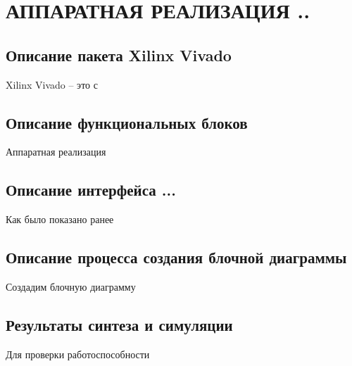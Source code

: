 \chapter[Аппаратная реализация ...]
{АППАРАТНАЯ РЕАЛИЗАЦИЯ ..}

\section{Описание пакета Xilinx Vivado}
\hspace*{12.5 mm}Xilinx Vivado – это с

\section{Описание функциональных блоков}
\hspace*{12.5 mm}Аппаратная реализация 

\section{Описание интерфейса ...}
\hspace*{12.5 mm}Как было показано ранее 

\section{Описание процесса создания блочной диаграммы}
\hspace*{12.5 mm}Создадим блочную диаграмму

\section{Результаты синтеза и симуляции}
\hspace*{12.5 mm}Для проверки работоспособности 